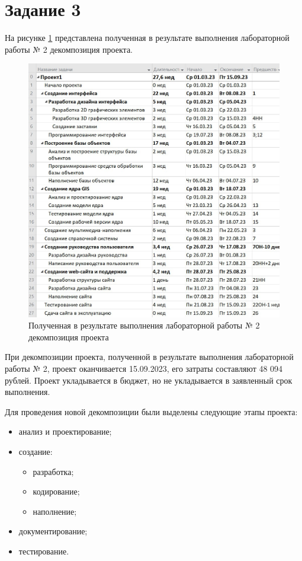 \section*{Задание 3}

На рисунке \ref{img:lab2} представлена полученная в результате выполнения лабораторной работы № 2 декомпозиция проекта.

\begin{figure}[H]
	\begin{center}
		\includegraphics[scale=0.35]{inc/img/lab2.jpg}
	\end{center}
	\captionsetup{justification=centering}
	\caption{Полученная в результате выполнения лабораторной работы № 2 декомпозиция проекта}
	\label{img:lab2}
\end{figure}

При декомпозиции проекта, полученной в результате выполнения лабораторной работы № 2, проект оканчивается 15.09.2023, его затраты составляют 48 094 рублей. Проект укладывается в бюджет, но не укладывается в заявленный срок выполнения.

Для проведения новой декомпозиции были выделены следующие этапы проекта:

\begin{itemize}
	\item анализ и проектирование;
	\item создание:
		\begin{itemize}
			\item разработка;
			\item кодирование;
			\item наполнение;
		\end{itemize}
	\item документирование;
	\item тестирование.
\end{itemize}

